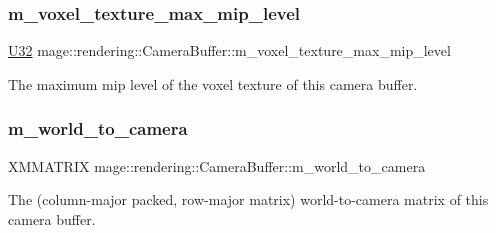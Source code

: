 \subsubsection{\texorpdfstring{m\+\_\+voxel\+\_\+texture\+\_\+max\+\_\+mip\+\_\+level}{m\_voxel\_texture\_max\_mip\_level}}
{\footnotesize\ttfamily \hyperlink{namespacemage_a41c104c036fba3756a74e19f793eeaa1}{U32} mage\+::rendering\+::\+Camera\+Buffer\+::m\+\_\+voxel\+\_\+texture\+\_\+max\+\_\+mip\+\_\+level}

The maximum mip level of the voxel texture of this camera buffer. \hypertarget{structmage_1_1rendering_1_1_camera_buffer_af1ceff883dcc383ce10f2165a5a9a061}{}\label{structmage_1_1rendering_1_1_camera_buffer_af1ceff883dcc383ce10f2165a5a9a061} 
\subsubsection{\texorpdfstring{m\+\_\+world\+\_\+to\+\_\+camera}{m\_world\_to\_camera}}
{\footnotesize\ttfamily X\+M\+M\+A\+T\+R\+IX mage\+::rendering\+::\+Camera\+Buffer\+::m\+\_\+world\+\_\+to\+\_\+camera}

The (column-\/major packed, row-\/major matrix) world-\/to-\/camera matrix of this camera buffer. 